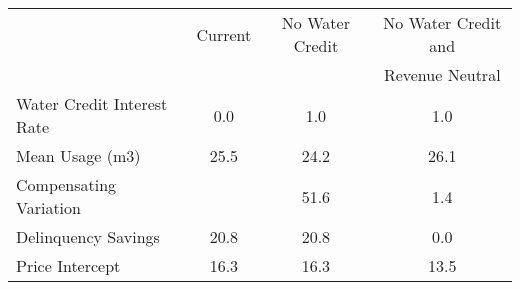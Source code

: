 \begin{tabular}{lccc}
& Current & No Water Credit & No Water Credit and \\
&         &                  & Revenue Neutral \\
Water Credit Interest Rate &0.0&1.0&1.0\\
Mean Usage (m3) &25.5&24.2&26.1\\
Compensating Variation  & &51.6&1.4\\
Delinquency Savings  &20.8&20.8&0.0\\
Price Intercept  &16.3&16.3&13.5\\
\end{tabular} 
